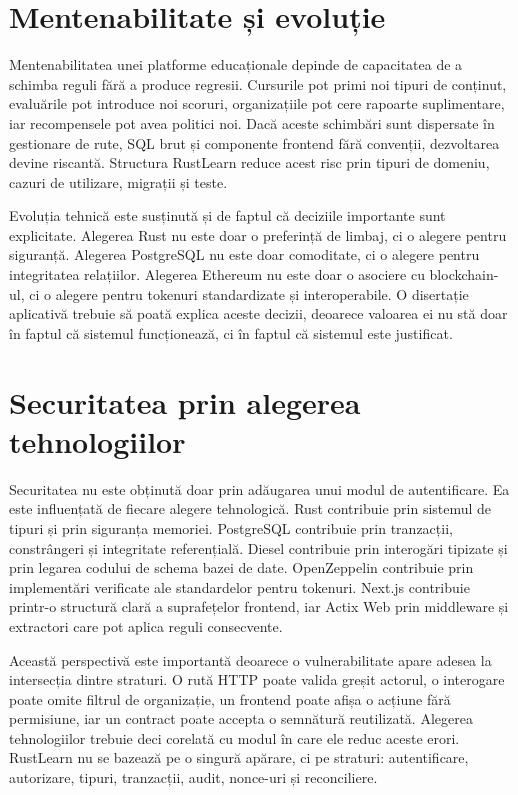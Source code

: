 \section{Mentenabilitate și evoluție}
Mentenabilitatea unei platforme educaționale depinde de capacitatea de a schimba reguli fără a produce regresii. Cursurile pot primi noi tipuri de conținut, evaluările pot introduce noi scoruri, organizațiile pot cere rapoarte suplimentare, iar recompensele pot avea politici noi. Dacă aceste schimbări sunt dispersate în gestionare de rute, SQL brut și componente frontend fără convenții, dezvoltarea devine riscantă. Structura RustLearn reduce acest risc prin tipuri de domeniu, cazuri de utilizare, migrații și teste.

Evoluția tehnică este susținută și de faptul că deciziile importante sunt explicitate. Alegerea Rust nu este doar o preferință de limbaj, ci o alegere pentru siguranță. Alegerea PostgreSQL nu este doar comoditate, ci o alegere pentru integritatea relațiilor. Alegerea Ethereum nu este doar o asociere cu blockchain-ul, ci o alegere pentru tokenuri standardizate și interoperabile. O disertație aplicativă trebuie să poată explica aceste decizii, deoarece valoarea ei nu stă doar în faptul că sistemul funcționează, ci în faptul că sistemul este justificat.

\section{Securitatea prin alegerea tehnologiilor}
Securitatea nu este obținută doar prin adăugarea unui modul de autentificare. Ea este influențată de fiecare alegere tehnologică. Rust contribuie prin sistemul de tipuri și prin siguranța memoriei. PostgreSQL contribuie prin tranzacții, constrângeri și integritate referențială. Diesel contribuie prin interogări tipizate și prin legarea codului de schema bazei de date. OpenZeppelin contribuie prin implementări verificate ale standardelor pentru tokenuri. Next.js contribuie printr-o structură clară a suprafețelor frontend, iar Actix Web prin middleware și extractori care pot aplica reguli consecvente.

Această perspectivă este importantă deoarece o vulnerabilitate apare adesea la intersecția dintre straturi. O rută HTTP poate valida greșit actorul, o interogare poate omite filtrul de organizație, un frontend poate afișa o acțiune fără permisiune, iar un contract poate accepta o semnătură reutilizată. Alegerea tehnologiilor trebuie deci corelată cu modul în care ele reduc aceste erori. RustLearn nu se bazează pe o singură apărare, ci pe straturi: autentificare, autorizare, tipuri, tranzacții, audit, nonce-uri și reconciliere.

